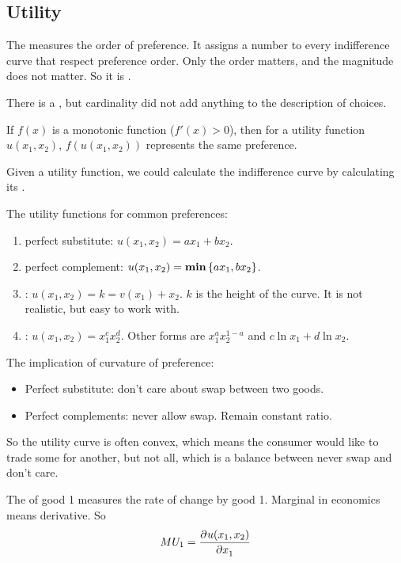 \subsection{Utility}

The  measures the order of preference. It assigns a number to every indifference curve that respect preference order. Only the order matters, and the magnitude does not matter. So it is . 

There is a , but cardinality did not add anything to the description of choices.


\begin{theorem}
    If $f(x)$ is a monotonic function ($f'(x) > 0$), then for a utility function $u(x_1,x_2)$, $f\left(u(x_1,x_2)\right)$ represents the same preference.
\end{theorem}

Given a utility function, we could calculate the indifference curve by calculating its .


The utility functions for common preferences:
\begin{enumerate}
    \item perfect substitute: $u(x_1,x_2) = a x_1 + b x_2$.
    \item perfect complement: $u(x_1,x_2) = \mathbf{min} \set{a x_1, b x_2} $.
    \item {}: $u(x_1,x_2) = k = v(x_1) + x_2$. $k$ is the height of the curve. It is not realistic, but easy to work with.
    \item {}: $u(x_1,x_2) = x_1^c x_2^d$. Other forms are $x_1^a x_2^{1-a}$ and $c \ln x_1 + d \ln x_2$.
\end{enumerate}

The implication of curvature of preference:
\begin{itemize}
    \item Perfect substitute: don't care about swap between two goods.
    \item Perfect complements: never allow swap. Remain constant ratio.
\end{itemize}

So the utility curve is often convex, which means the consumer would like to trade some for another, but not all, which is a balance between never swap and don't care.


The  of good 1 measures the rate of change by good 1. Marginal in economics means derivative. So 
\begin{equation}
    MU_1 = \dpd{u(x_1,x_2)}{x_1}
\end{equation}

